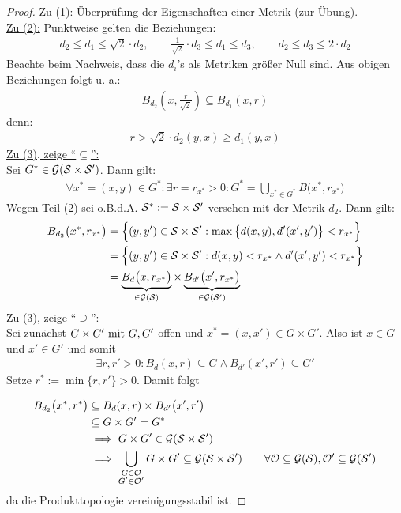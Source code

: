 \begin{proof}\enter
	\underline{Zu (1):} Überprüfung der Eigenschaften einer Metrik (zur Übung).\\
	\underline{Zu (2):} Punktweise gelten die Beziehungen:
	\begin{align*}
		d_2\leq d_1\leq\sqrt{2}\cdot d_2,\qquad
		\frac{1}{\sqrt{2}}\cdot d_3\leq d_1\leq d_3,\qquad
		d_2\leq d_3\leq 2\cdot d_2
	\end{align*}
	Beachte beim Nachweis, dass die $d_i$'s als Metriken größer Null sind. Aus obigen Beziehungen folgt u. a.:
	\begin{align*}
		B_{d_2}\left(x,\frac{r}{\sqrt{2}}\right)\subseteq B_{d_1}(x,r)
	\end{align*}
	denn:
	\begin{align*}
		r>\sqrt{2}\cdot d_2(y,x)\geq d_1(y,x)
	\end{align*}
	\underline{Zu (3), zeige ``$\subseteq$'':}\\
	Sei $G^\ast\in\mathcal{G}(\S\times\S')$. Dann gilt:
	\begin{align*}
		\forall x^\ast=(x,y)\in G^\ast:\exists r=r_{x^\ast}>0:
		G^\ast=\bigcup\limits_{x^\ast\in G^\ast} B\big(x^\ast,r_{x^\ast}\big)
	\end{align*}
	Wegen Teil (2) sei o.B.d.A. $\S^\ast:=\S\times\S'$ versehen mit der Metrik $d_2$. Dann gilt:
	\begin{align*}
		B_{d_2}\big(x^\ast,r_{x^\ast}\big)&=\Big\lbrace(y,y')\in \S\times\S':\max\big\lbrace d(x,y),d'(x',y')\big\rbrace<r_{x^\ast}\Big\rbrace\\
		&=\Big\lbrace(y,y')\in\S\times\S':d(x,y)<r_{x^\ast}\wedge d'(x',y')<r_{x^\ast}\Big\rbrace\\
		&= \underbrace{B_d\big(x,r_{x^\ast}\big)}_{\in\mathcal{G}(\S)}\times \underbrace{B_{d'}\big(x', r_{x^\ast}\big)}_{\in\mathcal{G}(\S')}
	\end{align*}
	\underline{Zu (3), zeige ``$\supseteq$'':}\\
	Sei zunächst $G\times G'\mit G,G'$ offen und $x^\ast=(x,x')\in G\times G'$. Also ist $x\in G$ und $x'\in G'$ und somit
	\begin{align*}
		\exists r,r'>0:B_d(x,r)\subseteq G\wedge B_{d'}(x',r')\subseteq G'
	\end{align*}
	Setze $r^\ast:=\min\lbrace r,r'\rbrace>0$. Damit folgt

	\begin{align*}
		B_{d_2}\big( x^\ast,r^\ast\big)&\subseteq B_d(x,r)\times B_{d'}\big(x',r'\big)\\
		&\subseteq
		G\times G'=G^\ast\\
		&\implies
		G\times G'\in\mathcal{G}(\S\times\S')\\
		&\implies
		\bigcup\limits_{\begin{subarray}{c} G\in\mathcal{O}\\G'\in\mathcal{O}'\end{subarray}}G\times G'\subseteq\mathcal{G}(\S\times\S')
		\qquad\forall\mathcal{O}\subseteq\mathcal{G}(\S),\mathcal{O}'\subseteq\mathcal{G}(\S')
	\end{align*}
	da die Produkttopologie vereinigungsstabil ist.
\end{proof}

